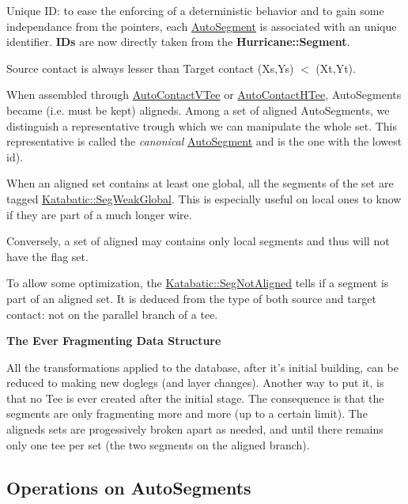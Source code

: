 \begin{DoxyItemize}
\item Unique I\-D\-: to ease the enforcing of a deterministic behavior and to gain some independance from the pointers, each \hyperlink{classKatabatic_1_1AutoSegment}{Auto\-Segment} is associated with an unique identifier. {\bfseries I\-Ds} are now directly taken from the {\bf Hurricane\-::\-Segment}. 
\item Source contact is always lesser than Target contact {\ttfamily (Xs,Ys) $<$ (Xt,Yt)}. 
\item When assembled through \hyperlink{classKatabatic_1_1AutoContactVTee}{Auto\-Contact\-V\-Tee} or \hyperlink{classKatabatic_1_1AutoContactHTee}{Auto\-Contact\-H\-Tee}, Auto\-Segments became (i.\-e. must be kept) aligneds. Among a set of aligned Auto\-Segments, we distinguish a representative trough which we can manipulate the whole set. This representative is called the {\itshape canonical} \hyperlink{classKatabatic_1_1AutoSegment}{Auto\-Segment} and is the one with the lowest {\ttfamily id}). 
\item When an aligned set contains at least one global, all the segments of the set are tagged \hyperlink{namespaceKatabatic_a94585537ee1724ea9315578ec54380f4a16ef6f2b6b9e44559e41f04c652919ad}{Katabatic\-::\-Seg\-Weak\-Global}. This is especially useful on local ones to know if they are part of a much longer wire.

Conversely, a set of aligned may contains only local segments and thus will not have the flag set. 
\item To allow some optimization, the \hyperlink{namespaceKatabatic_a94585537ee1724ea9315578ec54380f4a637e0426170a532feac45548e009325d}{Katabatic\-::\-Seg\-Not\-Aligned} tells if a segment is part of an aligned set. It is deduced from the type of both source and target contact\-: not on the parallel branch of a tee. 
\end{DoxyItemize}

{\bfseries The Ever Fragmenting Data Structure}

All the transformations applied to the database, after it's initial building, can be reduced to making new doglegs (and layer changes). Another way to put it, is that no Tee is ever created after the initial stage. The consequence is that the segments are only fragmenting more and more (up to a certain limit). The aligneds sets are progessively broken apart as needed, and until there remains only one tee per set (the two segments on the aligned branch).\hypertarget{classKatabatic_1_1AutoSegment_secASOperations}{}\subsection{Operations on Auto\-Segments}\label{classKatabatic_1_1AutoSegment_secASOperations}

